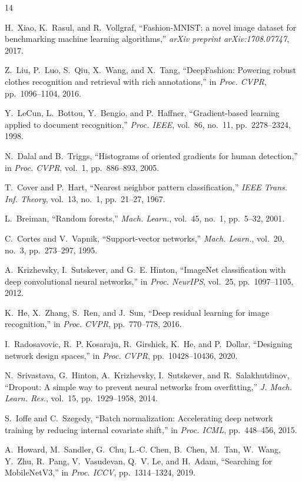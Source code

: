 \documentclass[conference]{IEEEtran}
\begin{document}
\begin{thebibliography}{14}

H.~Xiao, K.~Rasul, and R.~Vollgraf,
``Fashion-{MNIST}: a novel image dataset for benchmarking machine learning algorithms,''
\textit{arXiv preprint arXiv:1708.07747}, 2017.

Z.~Liu, P.~Luo, S.~Qiu, X.~Wang, and X.~Tang,
``DeepFashion: Powering robust clothes recognition and retrieval with rich annotations,''
in \textit{Proc. CVPR}, pp.~1096--1104, 2016.

Y.~LeCun, L.~Bottou, Y.~Bengio, and P.~Haffner,
``Gradient-based learning applied to document recognition,''
\textit{Proc. IEEE}, vol.~86, no.~11, pp.~2278--2324, 1998.

N.~Dalal and B.~Triggs,
``Histograms of oriented gradients for human detection,''
in \textit{Proc. CVPR}, vol.~1, pp.~886--893, 2005.

T.~Cover and P.~Hart,
``Nearest neighbor pattern classification,''
\textit{IEEE Trans. Inf. Theory}, vol.~13, no.~1, pp.~21--27, 1967.

L.~Breiman,
``Random forests,''
\textit{Mach. Learn.}, vol.~45, no.~1, pp.~5--32, 2001.

C.~Cortes and V.~Vapnik,
``Support-vector networks,''
\textit{Mach. Learn.}, vol.~20, no.~3, pp.~273--297, 1995.

A.~Krizhevsky, I.~Sutskever, and G.~E. Hinton,
``ImageNet classification with deep convolutional neural networks,''
in \textit{Proc. NeurIPS}, vol.~25, pp.~1097--1105, 2012.

K.~He, X.~Zhang, S.~Ren, and J.~Sun,
``Deep residual learning for image recognition,''
in \textit{Proc. CVPR}, pp.~770--778, 2016.

I.~Radosavovic, R.~P. Kosaraju, R.~Girshick, K.~He, and P.~Dollar,
``Designing network design spaces,''
in \textit{Proc. CVPR}, pp.~10428--10436, 2020.

N.~Srivastava, G.~Hinton, A.~Krizhevsky, I.~Sutskever, and R.~Salakhutdinov,
``Dropout: A simple way to prevent neural networks from overfitting,''
\textit{J. Mach. Learn. Res.}, vol.~15, pp.~1929--1958, 2014.

S.~Ioffe and C.~Szegedy,
``Batch normalization: Accelerating deep network training by reducing internal covariate shift,''
in \textit{Proc. ICML}, pp.~448--456, 2015.

A.~Howard, M.~Sandler, G.~Chu, L.-C. Chen, B.~Chen, M.~Tan, W.~Wang, Y.~Zhu,
R.~Pang, V.~Vasudevan, Q.~V. Le, and H.~Adam,
``Searching for {MobileNetV3},''
in \textit{Proc. ICCV}, pp.~1314--1324, 2019.

\end{thebibliography}
\end{document}
